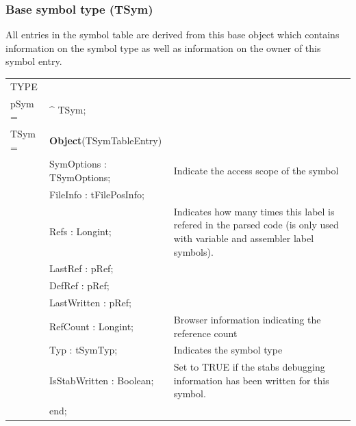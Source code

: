 \documentclass [a4paper,12pt]{article}
\begin{document}
\subsubsection{Base symbol type (TSym)}
\label{subsubsec:mylabel1}

All entries in the symbol table are derived from this base object which
contains information on the symbol type as well as information on the owner
of this symbol entry.

\begin{tabular*}{6.5in}{|l@{\extracolsep{\fill}}lp{9cm}|}
\hline
\textsf{TYPE} & &  \\
\xspace pSym = & \^{}  TSym; & \\
\xspace \textsf{TSym} = & \textbf{Object}(TSymTableEntry) & \\
& \textsf{SymOptions : TSymOptions;}& Indicate the access scope of the symbol \\
& \textsf{FileInfo : tFilePosInfo;}&  \\
& \textsf{Refs : Longint;}&
    Indicates how many times this label is refered in the parsed code (is only used with variable and assembler label symbols). \\
&\textsf{LastRef : pRef;}&  \\
&\textsf{DefRef : pRef;}&  \\
&\textsf{LastWritten : pRef;}& \\
&\textsf{RefCount : Longint;}& Browser information indicating the reference count\\
&\textsf{Typ : tSymTyp;}& Indicates the symbol type \\
&\textsf{IsStabWritten : Boolean;}& Set to TRUE if the stabs debugging information has been written for this symbol.\\
&\textsf{end; }&\\
\hline 
\end{tabular*}
\end{document}
